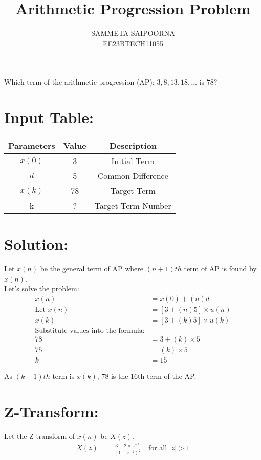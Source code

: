 \documentclass[12pt]{article}
\title{Arithmetic Progression Problem}
\author{SAMMETA SAIPOORNA \\
        EE23BTECH11055}
\date{}
\newcommand{\initialterm}{3}
\newcommand{\commondifference}{5}
\newcommand{\targetterm}{78}
\begin{document}
\maketitle

Which term of the arithmetic progression (AP): \(3, 8, 13, 18, \ldots\) is \(78\)?

\section{Input Table:}
\begin{center}
\begin{tabular}{|c|c|c|}
  \hline
   Parameters & Value & Description \\
  \hline
   \(x(0)\) & 3 & Initial Term \\
  \hline
   \(d\) & 5 & Common Difference \\
  \hline
   \(x(k)\) & 78 & Target Term \\
  \hline
  k & ? & Target Term Number\\
  \hline
\end{tabular}
\end{center}

\section{Solution:}
Let $x(n)$ be the general term of AP where $(n+1)th$ term of AP is found by $x(n)$.\\ 
Let's solve the problem:
\begin{align}
x(n) &= x(0) + (n)d \\
\text{Let } x(n) &= [\initialterm + (n)\commondifference] \times u(n) \\
x(k) &= [\initialterm + (k)\commondifference] \times u(k)\\
\text{Substitute values into the formula:} \\
\targetterm &= \initialterm + (k) \times \commondifference \\
75 &= (k) \times 5 \\
k &= 15
\end{align}

As $(k+1)th$ term is $x(k)$, 78 is the 16th term of the AP.\\ 


\section{Z-Transform:}
Let the Z-transform of \(x(n)\) be \(X(z)\).
\begin{align}
X(z) &= \frac{3 +2\times z^{-1}}{(1 - z^{-1})^2} \quad \text{for all } |z| > 1
\end{align}
\end{document}
